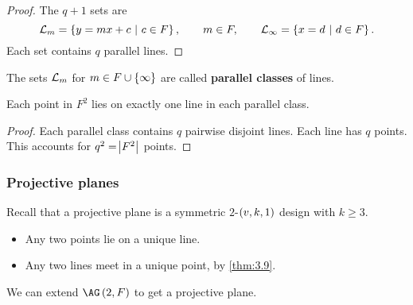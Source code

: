 \begin{proof}
The $ q + 1 $ sets are
$$ \LLL_m = \cbr{y = mx + c \st c \in F}, \qquad m \in F, \qquad \LLL_\infty = \cbr{x = d \st d \in F}. $$
Each set contains $ q $ parallel lines.
\end{proof}

\begin{definition*}
The sets $ \mathcal{L}_m $ for $ m \in F \cup \cbr{\infty} $ are called \textbf{parallel classes} of lines.
\end{definition*}

\begin{proposition}
\label{prop:3.14}
Each point in $ F^2 $ lies on exactly one line in each parallel class.
\end{proposition}

\begin{proof}
Each parallel class contains $ q $ pairwise disjoint lines. Each line has $ q $ points. This accounts for $ q^2 = \abs{F^2} $ points.
\end{proof}

\pagebreak

\subsubsection{Projective planes}

Recall that a projective plane is a symmetric $ 2 $-$ \br{v, k, 1} $ design with $ k \ge 3 $.
\begin{itemize}
\item Any two points lie on a unique line.
\item Any two lines meet in a unique point, by \ref{thm:3.9}.
\end{itemize}
We can extend $ \AG\br{2, F} $ to get a projective plane.

